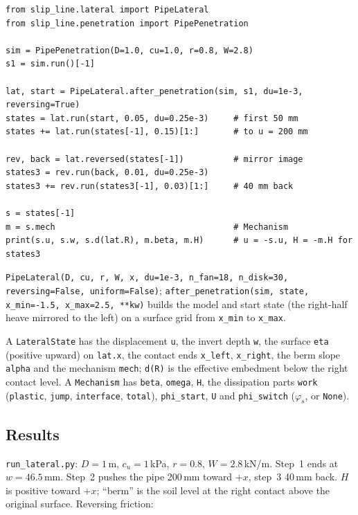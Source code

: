 \documentclass[11pt,a4paper]{article}
\begin{document}
\begin{lstlisting}
from slip_line.lateral import PipeLateral
from slip_line.penetration import PipePenetration

sim = PipePenetration(D=1.0, cu=1.0, r=0.8, W=2.8)
s1 = sim.run()[-1]

lat, start = PipeLateral.after_penetration(sim, s1, du=1e-3, reversing=True)
states = lat.run(start, 0.05, du=0.25e-3)     # first 50 mm
states += lat.run(states[-1], 0.15)[1:]       # to u = 200 mm

rev, back = lat.reversed(states[-1])          # mirror image
states3 = rev.run(back, 0.01, du=0.25e-3)
states3 += rev.run(states3[-1], 0.03)[1:]     # 40 mm back

s = states[-1]
m = s.mech                                    # Mechanism
print(s.u, s.w, s.d(lat.R), m.beta, m.H)      # u = -s.u, H = -m.H for states3
\end{lstlisting}

\texttt{PipeLateral(D, cu, r, W, x, du=1e-3, n\_fan=18, n\_disk=30,
reversing=False, uniform=False)}; \texttt{after\_penetration(sim, state, x\_min=-1.5,
x\_max=2.5, **kw)} builds the model and start state (the right-half
heave mirrored to the left) on a surface grid from \texttt{x\_min} to
\texttt{x\_max}.

A \texttt{LateralState} has the displacement \texttt{u}, the invert
depth \texttt{w}, the surface \texttt{eta} (positive upward) on
\texttt{lat.x}, the contact ends \texttt{x\_left}, \texttt{x\_right},
the berm slope \texttt{alpha} and the mechanism \texttt{mech};
\texttt{d(R)} is the effective embedment below the right contact level.
A \texttt{Mechanism} has \texttt{beta}, \texttt{omega}, \texttt{H}, the
dissipation parts \texttt{work} (\texttt{plastic}, \texttt{jump},
\texttt{interface}, \texttt{total}), \texttt{phi\_start}, \texttt{U} and
\texttt{phi\_switch} ($\varphi_s$, or \texttt{None}).

\subsection{Results}

\texttt{run\_lateral.py}: $D = 1$\,m, $c_u = 1$\,kPa, $r = 0.8$,
$W = 2.8$\,kN/m.  Step~1 ends at $w = 46.5$\,mm.  Step~2 pushes the pipe
200\,mm toward $+x$, step~3 40\,mm back.  $H$ is positive toward $+x$;
``berm'' is the soil level at the right contact above the original
surface.  Reversing friction:
\end{document}
